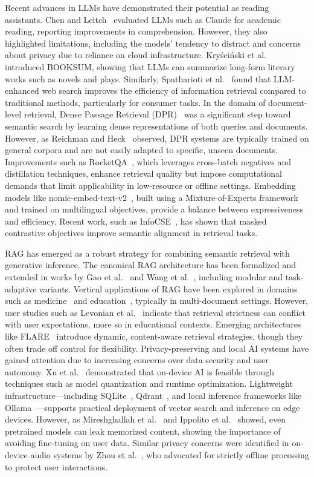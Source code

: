 Recent advances in LLMs have demonstrated their potential as reading assistants. Chen and Leitch~\cite{b6} evaluated LLMs such as Claude for academic reading, reporting improvements in comprehension. However, they also highlighted limitations, including the models’ tendency to distract and concerns about privacy due to reliance on cloud infrastructure. Kryściński et al.~\cite{b7} introduced BOOKSUM, showing that LLMs can summarize long-form literary works such as novels and plays. Similarly, Spatharioti et al.~\cite{b8} found that LLM-enhanced web search improves the efficiency of information retrieval compared to traditional methods, particularly for consumer tasks. In the domain of document-level retrieval, Dense Passage Retrieval (DPR)~\cite{b9} was a significant step toward semantic search by learning dense representations of both queries and documents. However, as Reichman and Heck~\cite{b10} observed, DPR systems are typically trained on general corpora and are not easily adapted to specific, unseen documents. Improvements such as RocketQA~\cite{b11}, which leverages cross-batch negatives and distillation techniques, enhance retrieval quality but impose computational demands that limit applicability in low-resource or offline settings. Embedding models like nomic-embed-text-v2~\cite{b12}, built using a Mixture-of-Experts framework and trained on multilingual objectives, provide a balance between expressiveness and efficiency. Recent work, such as InfoCSE~\cite{b13}, has shown that masked contrastive objectives improve semantic alignment in retrieval tasks.

RAG has emerged as a robust strategy for combining semantic retrieval with generative inference. The canonical RAG architecture has been formalized and extended in works by Gao et al.~\cite{b14} and Wang et al.~\cite{b15}, including modular and task-adaptive variants. Vertical applications of RAG have been explored in domains such as medicine~\cite{b16,b17} and education~\cite{b18,b19}, typically in multi-document settings. However, user studies such as Levonian et al.~\cite{b19} indicate that retrieval strictness can conflict with user expectations, more so in educational contexts. Emerging architectures like FLARE~\cite{b20} introduce dynamic, content-aware retrieval strategies, though they often trade off control for flexibility. Privacy-preserving and local AI systems have gained attention due to increasing concerns over data security and user autonomy. Xu et al.~\cite{b21} demonstrated that on-device AI is feasible through techniques such as model quantization and runtime optimization. Lightweight infrastructure—including SQLite~\cite{b22}, Qdrant~\cite{b23}, and local inference frameworks like Ollama~\cite{b24}—supports practical deployment of vector search and inference on edge devices. However, as Mireshghallah et al.~\cite{b25} and Ippolito et al.~\cite{b26} showed, even pretrained models can leak memorized content, showing the importance of avoiding fine-tuning on user data. Similar privacy concerns were identified in on-device audio systems by Zhou et al.~\cite{b27}, who advocated for strictly offline processing to protect user interactions.

